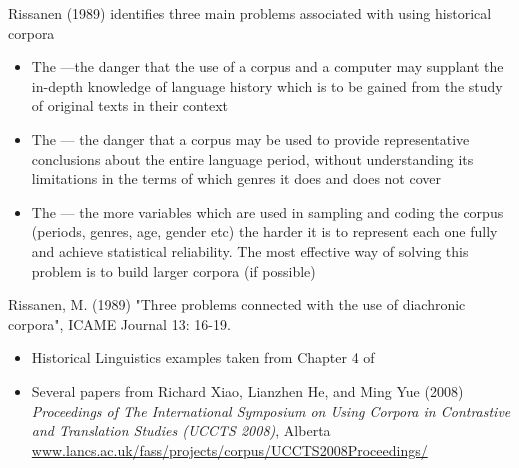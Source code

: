 \documentclass[a4paper,landscape,headrule,footrule,xetex]{foils}
\begin{document}
\MyLogo{}
Rissanen (1989) identifies three main problems associated with using historical corpora
\begin{itemize}
\item The  ---the danger that the use of a corpus and a computer may supplant the in-depth knowledge of language history which is to be gained from the study of original texts in their context
\item  The  --- the danger that a corpus may be used to provide representative conclusions about the entire language period, without understanding its limitations in the terms of which genres it does and does not cover
\item The  --- the more variables which are used in sampling and coding the corpus (periods, genres, age, gender etc) the harder it is to represent each one fully and achieve statistical reliability. The most effective way of solving this problem is to build larger corpora (if possible)
\end{itemize}

Rissanen, M. (1989) "Three problems connected with the use of
diachronic corpora", ICAME Journal 13: 16-19.


 \begin{itemize}
 \item Historical Linguistics examples taken from Chapter 4 of
 \item Several papers from Richard Xiao, Lianzhen He, and Ming Yue
   (2008) \textit{Proceedings of The International Symposium on Using
     Corpora in Contrastive and Translation Studies (UCCTS 2008)}, Alberta
\\ \url{www.lancs.ac.uk/fass/projects/corpus/UCCTS2008Proceedings/}
 \end{itemize}
%
\end{document}
